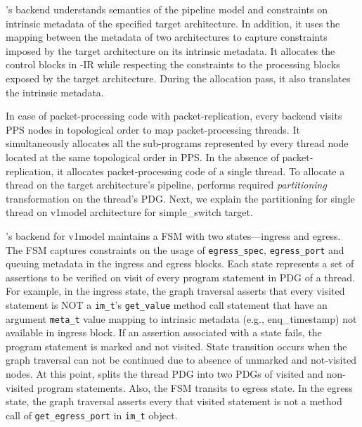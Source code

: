 \documentclass[letterpaper,twocolumn,10pt]{article}
\begin{document}
\ucomp's backend understands semantics of the pipeline model and
constraints on intrinsic metadata of the specified target
architecture. In addition, it uses the mapping between the metadata of
two architectures to capture constraints imposed by the target
architecture on its intrinsic metadata. It allocates the control
blocks in \uarch-IR while respecting the constraints to the processing
blocks exposed by the target architecture. During the allocation pass,
it also translates the intrinsic metadata.



%
In case of packet-processing code with packet-replication, every
backend visits PPS nodes in topological order to map packet-processing
threads. It simultaneously allocates all the sub-programs represented
by every thread node located at the same topological order in PPS. In
the absence of packet-replication, it allocates packet-processing code
of a single thread. To allocate a thread on the target architecture's
pipeline, \ucomp performs required \emph{partitioning} transformation
on the thread's PDG. Next, we explain the partitioning for single
thread on v1model architecture for simple\_switch target.

\ucomp's backend for v1model maintains a FSM with two
states---ingress and egress. The FSM captures constraints on the usage
of \texttt{egress\_spec}, \texttt{egress\_port} and queuing metadata
in the ingress and egress blocks. Each state represents a set of
assertions to be verified on visit of every program statement in PDG
of a thread. For example, in the ingress state, the graph traversal
asserts that every visited statement is NOT a \texttt{im\_t}'s
\texttt{get\_value} method call statement that have an argument
\texttt{meta\_t} value mapping to intrinsic metadata (e.g.,
enq\_timestamp) not available in ingress block.  If an assertion
associated with a state fails, the program statement is marked and not
visited. State transition occurs when the graph traversal can not be
continued due to absence of unmarked and not-visited nodes. At this
point, \ucomp splits the thread PDG into two PDGs of visited and
non-visited program statements. Also, the FSM transits to egress
state.  In the egress state, the graph traversal asserts every that
visited statement is not a method call of \texttt{get\_egress\_port}
in \texttt{im\_t} object.
\end{document}
